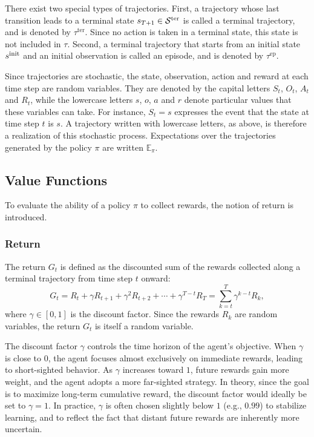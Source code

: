 There exist two special types of trajectories.
First, a trajectory whose last transition leads to a terminal state \(s_{T+1} \in \mathcal{S}^{\mathrm{ter}}\) is called a terminal trajectory, and is denoted by \(\tau^{\mathrm{ter}}\).
Since no action is taken in a terminal state, this state is not included in \(\tau\).
Second, a terminal trajectory that starts from an initial state \(s^{\mathrm{init}}\) and an initial observation is called an episode, and is denoted by \(\tau^{\mathrm{ep}}\).

Since trajectories are stochastic, the state, observation, action and reward at each time step are random variables.
They are denoted by the capital letters \(S_t\), \(O_t\), \(A_t\) and \(R_t\), while the lowercase letters \(s\), \(o\), \(a\) and \(r\) denote particular values that these variables can take.
For instance, \(S_t = s\) expresses the event that the state at time step \(t\) is \(s\).
A trajectory written with lowercase letters, as above, is therefore a realization of this stochastic process.
Expectations over the trajectories generated by the policy \(\pi\) are written \(\mathbb{E}_\pi\).

\subsection{Value Functions}
\label{subsec:value_functions}

To evaluate the ability of a policy \(\pi\) to collect rewards, the notion of return is introduced.

\subsubsection{Return}
\label{subsubsec:return}

The return \(G_t\) is defined as the discounted sum of the rewards collected along a terminal trajectory from time step \(t\) onward:
\[
G_t = R_t + \gamma R_{t+1} + \gamma^2 R_{t+2} + \cdots + \gamma^{T-t} R_T = \sum_{k=t}^{T} \gamma^{k-t} R_k,
\]
where \(\gamma \in [0, 1]\) is the discount factor.
Since the rewards \(R_k\) are random variables, the return \(G_t\) is itself a random variable.

The discount factor \(\gamma\) controls the time horizon of the agent's objective.  
When \(\gamma\) is close to \(0\), the agent focuses almost exclusively on immediate rewards, leading to short-sighted behavior.  
As \(\gamma\) increases toward \(1\), future rewards gain more weight, and the agent adopts a more far-sighted strategy.  
In theory, since the goal is to maximize long-term cumulative reward, the discount factor would ideally be set to \(\gamma = 1\).
In practice, \(\gamma\) is often chosen slightly below \(1\) (e.g., \(0.99\)) to stabilize learning, and to reflect the fact that distant future rewards are inherently more uncertain.

